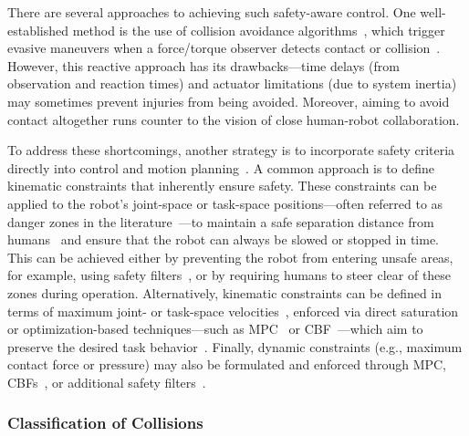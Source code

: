 There are several approaches to achieving such safety-aware control. One well-established method is the use of collision avoidance algorithms~\citep{haddadin2013towards}, which trigger evasive maneuvers when a force/torque observer detects contact or collision~\citep{de2006collision, haddadin2008collision, haddadin2011study}. However, this reactive approach has its drawbacks—time delays (from observation and reaction times) and actuator limitations (due to system inertia) may sometimes prevent injuries from being avoided. Moreover, aiming to avoid contact altogether runs counter to the vision of close human-robot collaboration.

To address these shortcomings, another strategy is to incorporate safety criteria directly into control and motion planning~\citep{haddadin2013towards}. A common approach is to define kinematic constraints that inherently ensure safety. These constraints can be applied to the robot’s joint-space or task-space positions—often referred to as danger zones in the literature~\citep{lacevic2011safety, lacevic2022safe}—to maintain a safe separation distance from humans~\citep{iso2016collaborative} and ensure that the robot can always be slowed or stopped in time. This can be achieved either by preventing the robot from entering unsafe areas, for example, using safety filters~\citep{haddadin2010real, bertino2023prescribed}, or by requiring humans to steer clear of these zones during operation. Alternatively, kinematic constraints can be defined in terms of maximum joint- or task-space velocities~\citep{ferraguti2020control, pupa2024efficient, iso2016collaborative}, enforced via direct saturation or optimization-based techniques—such as \gls{MPC}~\citep{pupa2024efficient} or \gls{CBF}~\citep{ferraguti2020control}—which aim to preserve the desired task behavior~\citep{haddadin2010real}. Finally, dynamic constraints (e.g., maximum contact force or pressure) may also be formulated and enforced through \gls{MPC}, \glspl{CBF}~\citep{ames2016control}, or additional safety filters~\citep{hewing2020learning}.

\subsubsection{Classification of Collisions}

